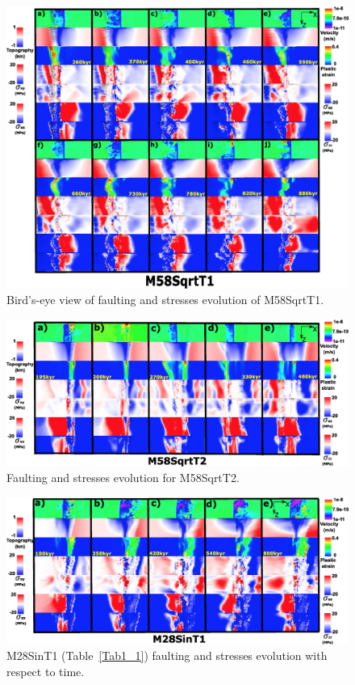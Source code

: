 \documentclass[draft,gc]{agutex}
\begin{document}
\begin{figure}[h]
\noindent\includegraphics[width=1.0\textwidth]{./Figures/fig_Results_Weakening_7_M58SqrtT1_time_evolution.eps}
 \caption{Bird's-eye view of faulting and stresses evolution of M58SqrtT1.}
\label{fig_Results_Weakenging_7}
\end{figure}

\begin{figure}[h]
\noindent\includegraphics[width=1.0\textwidth]{./Figures/fig_Results_Weakening_8_M58SqrtT2_time_evolution.eps}
 \caption{Faulting and stresses evolution for M58SqrtT2.}
\label{fig_Results_Weakenging_8}
\end{figure}

\begin{figure}[h]
\noindent\includegraphics[width=1.0\textwidth]{./Figures/fig_Results_MRange_1_M28SinT1_time_evolution.eps}
 \caption{M28SinT1 (Table~\ref{Tab1_1}) faulting and stresses evolution with respect to time.}
\label{fig_Results_MRange_1}
\end{figure}
\end{document}

